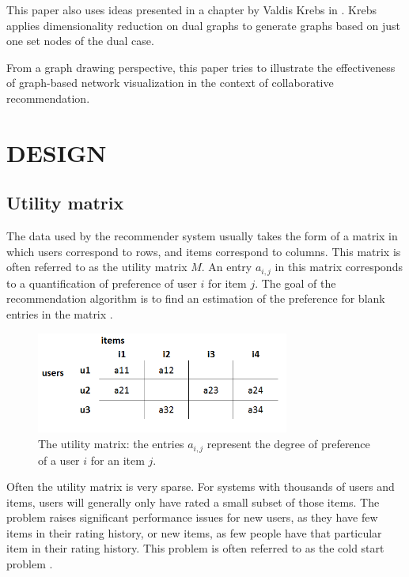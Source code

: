 \documentclass[a4paper,10pt,twocolumn]{article}
\begin{document}
This paper also uses ideas presented in a chapter by Valdis Krebs in \cite{steele2010}. Krebs applies dimensionality reduction on dual graphs to generate graphs based on just one set nodes of the dual case.

From a graph drawing perspective, this paper tries to illustrate the effectiveness of graph-based network visualization in the context of collaborative recommendation.



\section*{DESIGN}

\subsection*{Utility matrix}

The data used by the recommender system usually takes the form of a matrix in which users correspond to rows, and items correspond to columns. This matrix is often referred to as the utility matrix $M$. An entry $a_{i,j}$ in this matrix corresponds to a quantification of preference of user $i$ for item $j$. The goal of the recommendation algorithm is to find an estimation of the preference for blank entries in the matrix \cite{rajaraman2012}.

\begin{figure}[!ht]
  \begin{center}
  	
    \includegraphics[width=8.3cm]{data/utility-matrix}
  \end{center}
  \caption{The utility matrix: the entries $a_{i,j}$ represent the degree of preference of a user $i$ for an item $j$.}
  \label{fig:utilitymatrix}
\end{figure}

Often the utility matrix is very sparse. For systems with thousands of users and items, users will generally only have rated a small subset of those items. The problem raises significant performance issues for new users, as they have few items in their rating history, or new items, as few people have that particular item in their rating history. This problem is often referred to as the cold start problem \cite{herlocker2000, rajaraman2012}.
\end{document}
